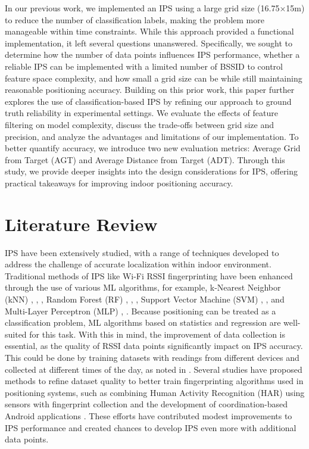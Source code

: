 \documentclass[conference]{IEEEtran}
\begin{document}
	In our previous work, we implemented an IPS using a large grid size (16.75×15m) to reduce the number of classification labels, making the problem more manageable within time constraints. While this approach provided a functional implementation, it left several questions unanswered. Specifically, we sought to determine how the number of data points influences IPS performance, whether a reliable IPS can be implemented with a limited number of BSSID to control feature space complexity, and how small a grid size can be while still maintaining reasonable positioning accuracy.
	Building on this prior work, this paper further explores the use of classification-based IPS by refining our approach to ground truth reliability in experimental settings. We evaluate the effects of feature filtering on model complexity, discuss the trade-offs between grid size and precision, and analyze the advantages and limitations of our implementation. To better quantify accuracy, we introduce two new evaluation metrics: Average Grid from Target (AGT) and Average Distance from Target (ADT). Through this study, we provide deeper insights into the design considerations for IPS, offering practical takeaways for improving indoor positioning accuracy.
	

	
	\section{Literature Review}
	IPS have been extensively studied, with a range of techniques developed to address the challenge of accurate localization within indoor environment. Traditional methods of IPS like Wi-Fi RSSI fingerprinting have been enhanced through the use of various ML algorithms, for example, k-Nearest Neighbor (kNN) \cite{LRE1}, \cite{LRE2}, \cite{LRE6}, Random Forest (RF) \cite{LRE1}, \cite{LRE6}, \cite{LRE5}, Support Vector Machine (SVM) \cite{LRE1}, \cite{LRE2}, \cite{LRE6} and Multi-Layer Perceptron (MLP) \cite{LRE1}, \cite{LRE2}. Because positioning can be treated as a classification problem,  ML algorithms based on statistics and regression are well-suited for this task. With this in mind, the improvement of data collection is essential, as the quality of RSSI data points significantly impact on IPS accuracy. This could be done by training datasets with readings from different devices and collected at different times of the day, as noted in \cite{LRE3}. Several studies have proposed methods to refine dataset quality to better train fingerprinting algorithms used in positioning systems, such as combining Human Activity Recognition (HAR) using sensors with fingerprint collection \cite{LRE4} and the development of coordination-based Android applications \cite{LRE7}. These efforts have contributed modest improvements to IPS performance and created chances to develop IPS even more with additional data points. 
	
\end{document}
